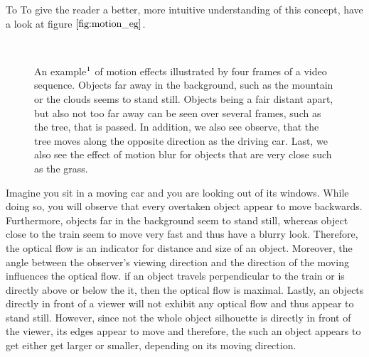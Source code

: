 To To give the reader a better, more intuitive understanding of this concept, have a look at figure $\ref{fig:motion_eg}$.
\begin{figure}[H]
\begin{center}
~
\end{center}
\caption[Motion Example]{An example$\footnotemark$ of motion effects illustrated by four frames of a video sequence. Objects far away in the background, such as the mountain or the clouds seems to stand still. Objects being a fair distant apart, but also not too far away can be seen over several frames, such as the tree, that is passed. In addition, we also see observe, that the tree moves along the opposite direction as the driving car. Last, we also see the effect of motion blur for objects that are very close such as the grass.}
\label{fig:motion_eg}
\end{figure}
Imagine you sit in a moving car and you are looking out of its windows. While doing so, you will observe that every overtaken object appear to move backwards. Furthermore, objects far in the background seem to stand still, whereas object close to the train seem to move very fast and thus have a blurry look. Therefore, the optical flow is an indicator for distance and size of an object. Moreover, the angle between the observer's viewing direction and the direction of the moving influences the optical flow. if an object travels perpendicular to the train or is directly above or below the it, then the optical flow is maximal. Lastly, an objects directly in front of a viewer will not exhibit any optical flow and thus appear to stand still. However, since not the whole object silhouette is directly in front of the viewer, its edges appear to move and therefore, the such an object appears to get either get larger or smaller, depending on its moving direction.

